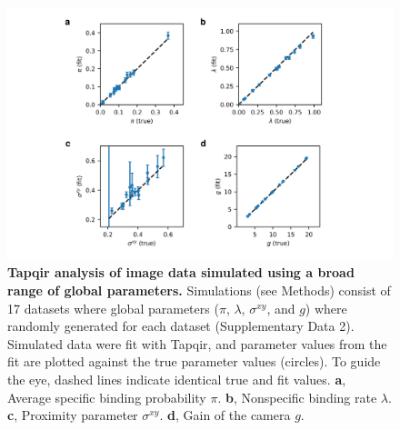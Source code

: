 \begin{figure}[h]
\centering
\includegraphics[width=150mm]{extended-data/figure2/figure2.png}
\caption{\textbf{Tapqir analysis of image data simulated using a broad range of global parameters.} Simulations (see Methods) consist of 17 datasets where global parameters ($\pi$, $\lambda$, $\sigma^{xy}$, and $g$) where randomly generated for each dataset (Supplementary Data 2). Simulated data were fit with Tapqir, and parameter values from the fit are plotted against the true parameter values (circles). To guide the eye, dashed lines  indicate identical true and fit values. \textbf{a}, Average specific binding probability $\pi$. \textbf{b}, Nonspecific binding rate $\lambda$. \textbf{c}, Proximity parameter $\sigma^{xy}$. \textbf{d}, Gain of the camera $g$. }
\label{fig:tapqir_global}
\end{figure}
\pagebreak

